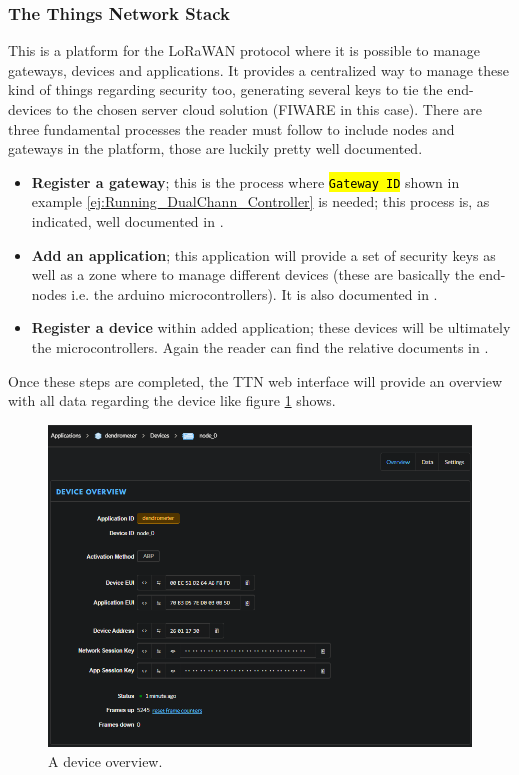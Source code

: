 \documentclass[11pt,a4paper,dvipsnames,twoside]{article}
\newcommand{\cmd}[1] {\hl{\texttt{#1}}}
\begin{document}
\subsubsection{The Things Network Stack}\label{sssec:TTN_Stack}
This is a platform for the LoRaWAN protocol where it is possible to manage gateways, devices and applications. It provides a centralized way to manage these kind of things regarding security too, generating several keys to tie the end-devices to the chosen server cloud solution (FIWARE in this case). There are three fundamental processes the reader must follow to include nodes and gateways in the platform, those are luckily pretty well documented. 

\begin{itemize}
  \item \textbf{Register a gateway}; this is the process where \cmd{Gateway ID} shown in example \ref{ej:Running_DualChann_Controller} is needed; this process is, as indicated, well documented in \cite{Gateway_reg}.
  \item \textbf{Add an application}; this application will provide a set of security keys as well as a zone where to manage different devices (these are basically the end-nodes i.e. the arduino microcontrollers). It is also documented in \cite{Add_application}.
  \item \textbf{Register a device} within added application; these devices will be ultimately the microcontrollers. Again the reader can find the relative documents in \cite{Device_reg}. 
\end{itemize}

Once these steps are completed, the TTN web interface will provide an overview with all data regarding the device like figure \ref{fig:dev_overview} shows. 

\begin{figure}[ht]
  \centering
  \includegraphics[width=.9\textwidth]{../pictures/TTN_dev_overview.png}
  \caption{A device overview.}
  \label{fig:dev_overview}
\end{figure}
\end{document}
